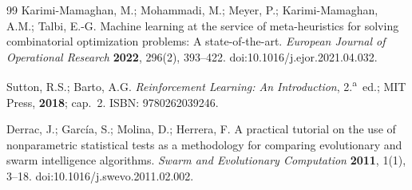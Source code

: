 \documentclass[10pt,a4paper]{article}
\begin{document}
\begin{thebibliography}{99}
 Karimi-Mamaghan, M.; Mohammadi, M.; Meyer, P.; Karimi-Mamaghan, A.M.;
Talbi, E.-G. Machine learning at the service of meta-heuristics for solving combinatorial
optimization problems: A state-of-the-art. \emph{European Journal of Operational Research}
\textbf{2022}, 296(2), 393--422. doi:10.1016/j.ejor.2021.04.032.

 Sutton, R.S.; Barto, A.G. \emph{Reinforcement Learning: An Introduction},
2.\textsuperscript{a}~ed.; MIT Press, \textbf{2018}; cap.~2. ISBN: 9780262039246.

 Derrac, J.; García, S.; Molina, D.; Herrera, F. A practical tutorial on the use
of nonparametric statistical tests as a methodology for comparing evolutionary and swarm
intelligence algorithms. \emph{Swarm and Evolutionary Computation} \textbf{2011}, 1(1), 3--18.
doi:10.1016/j.swevo.2011.02.002.

\end{thebibliography}
\end{document}
